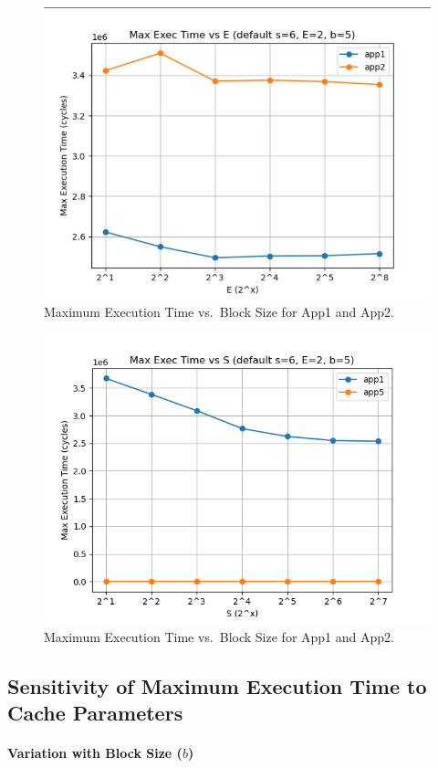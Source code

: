 \documentclass{article}
\begin{document}
\begin{figure}[!htbp]
  \centering
  \includegraphics[width=0.8\linewidth]{plot_e.png}
  \caption{Maximum Execution Time vs.\ Block Size for App1 and App2.}
  \label{fig:exec-vs-b}
\end{figure}

\begin{figure}[!htbp]
  \centering
  \includegraphics[width=0.8\linewidth]{plot_s.png}
  \caption{Maximum Execution Time vs.\ Block Size for App1 and App2.}
  \label{fig:exec-vs-b}
\end{figure}
\FloatBarrier

\subsection*{Sensitivity of Maximum Execution Time to Cache Parameters}

\paragraph{Variation with Block Size ($b$)}  
\end{document}
